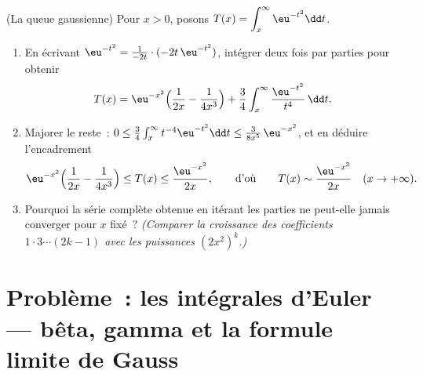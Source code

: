 \begin{exercise}[$\star\star\star$]\label{exo:b2:integration:12}
(La queue gaussienne) Pour $x > 0$, posons $T(x) = \displaystyle
\int_x^\infty \eu^{-t^2}\dd t$.
\begin{enumerate}
  \item En écrivant $\eu^{-t^2} = \frac{1}{-2t}\cdot(-2t\,\eu^{-t^2})$,
        intégrer deux fois par parties pour obtenir
        \[
        T(x) = \eu^{-x^2}\Bigl(\frac{1}{2x} -
        \frac{1}{4x^3}\Bigr) +
        \frac34\int_x^\infty \frac{\eu^{-t^2}}{t^4}\,\dd t .
        \]
  \item Majorer le reste~: $0 \leq \frac34\int_x^\infty
        t^{-4}\eu^{-t^2}\dd t \leq \frac{3}{8x^5}\,\eu^{-x^2}$,
        et en déduire l'encadrement
        \[
        \eu^{-x^2}\Bigl(\frac{1}{2x} - \frac{1}{4x^3}\Bigr)
        \leq T(x) \leq \frac{\eu^{-x^2}}{2x},
        \qquad\text{d'où}\qquad
        T(x) \sim \frac{\eu^{-x^2}}{2x} \quad (x \to +\infty).
        \]
  \item Pourquoi la série  complète obtenue en itérant
        les parties ne peut-elle jamais converger pour $x$ fixé~? \emph{(Comparer la
        croissance des coefficients $1\cdot3\cdots(2k-1)$ avec les
        puissances $(2x^2)^k$.)}
\end{enumerate}
\end{exercise}

\section{Problème~: les intégrales d'Euler --- bêta, gamma et la formule
limite de Gauss}


